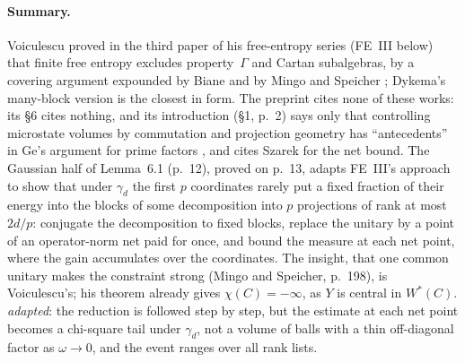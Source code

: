 \documentclass[11pt]{article}
\newcommand{\ploc}[2]{#1}
\newcommand{\sloc}[2]{\cite[#2]{#1}}
\newcommand{\rel}[1]{\textit{#1}}
\begin{document}
\paragraph{Summary.}
Voiculescu proved in the third paper of his free-entropy series
\cite{NL-Voiculescu1996} (FE~III below) that finite free entropy excludes
property~$\Gamma$ and Cartan subalgebras, by a covering argument expounded by
Biane \sloc{Biane2001-EntropieLibreAlgebresOperateurs}{Lemme~6.3,
pp.~289--290} and by Mingo and Speicher
\sloc{MingoSpeicher2017-FreeProbabilityRandomMatrices}{\S7.7.1, Lemma~9,
pp.~196--198}; Dykema's many-block version
\sloc{Dykema1996-TwoApplicationsFreeEntropy}{Lemma~2.2, pp.~3--7} is the
closest in form.
The preprint cites none of these works: its \S6 cites nothing, and its
introduction \ploc{(\S1, p.~2)}{01-introduction.tex:83--87} says only that
controlling microstate volumes by commutation and projection geometry has
``antecedents'' in Ge's argument for prime factors \cite{NL-Ge1996}, and cites
Szarek \cite{Szarek1997-MetricEntropyHomogeneousSpaces} for the net bound.
The Gaussian half of \ploc{Lemma~6.1 (p.~12)}{06-blocks.tex:79--87}, proved
on \ploc{p.~13}{06-blocks.tex:112--151}, adapts FE~III's approach to show that
under $\gamma_d$ the first $p$ coordinates rarely put a fixed fraction of
their energy into the blocks of some decomposition into $p$ projections of
rank at most $2d/p$: conjugate the decomposition to fixed blocks, replace the
unitary by a point of an operator-norm net paid for once, and bound the
measure at each net point, where the gain accumulates over the coordinates.
The insight, that one common unitary makes the constraint strong (Mingo and
Speicher, p.~198), is Voiculescu's; his theorem
\sloc{MingoSpeicher2017-FreeProbabilityRandomMatrices}{Theorem~7(i), p.~195}
already gives $\chi(C)=-\infty$, as $Y$ is central in $W^*(C)$.
\rel{adapted}: the reduction is followed step by step, but the estimate at
each net point becomes a chi-square tail under $\gamma_d$, not a volume of
balls with a thin off-diagonal factor as $\omega\to0$, and the event ranges
over all rank lists.
\end{document}
